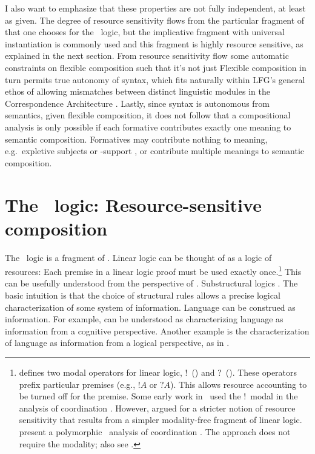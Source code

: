 \documentclass[output=paper,hidelinks]{langscibook}
\begin{document}
I also want to emphasize that
these properties are not fully independent, at least as
given. The degree of resource sensitivity flows from the particular
fragment of  \citep{girard1987} that one chooses for the
\glue\ logic, but the implicative
fragment with universal instantiation is commonly used and this
fragment is highly resource sensitive, as explained in the next
section. From resource sensitivity flow some automatic  constraints on
flexible composition such that it's not just 
Flexible composition in turn permits true autonomy of syntax, which
fits naturally within LFG's general ethos of allowing mismatches
between distinct linguistic modules in the Correspondence Architecture
\citep{kaplan1987three,kaplan1995formal,asudeh2006direct}. Lastly, since syntax is autonomous
from semantics, given flexible composition, it does not follow that a
compositional analysis is only possible if each formative contributes
exactly one meaning to semantic composition. Formatives may contribute
nothing to meaning, e.g.\ expletive subjects or -support
, or contribute multiple meanings to semantic composition. 


\section{The \glue\ logic: Resource-sensitive composition}
\label{sec:glue-logic}
  
The \glue\ logic is a fragment of 
\citep{girard1987,crouch;genabith00}. Linear logic can be thought of as a logic of
resources: Each premise in
a linear logic proof must be used exactly once.\footnote{\citet{girard1987} defines two modal operators for
  linear logic, !\ () and ?\ (). These
  operators prefix particular premises (e.g., $!A$ or $?A$). This
  allows resource accounting to be turned off for the premise. Some
  early work in \glue\ used the !\ modal in the analysis of
  coordination \citep{kehler;ea95,kehler;ea99}. However,
  \citet{Asudeh2004,Asudeh05cont} argued for a stricter notion of
  resource sensitivity that results from a simpler modality-free
  fragment of linear logic. \citet{asudeh;crouch02-lfg-coord}
  present a polymorphic \glue\ analysis of coordination
  \citep{steedman85,emms90,emms92}. The
  \citet{asudeh;crouch02-lfg-coord} approach does not require the
  modality; also see \citet[ch.\,16]{DLM:LFG}.} This can be usefully
understood from the perspective of . Substructural logics 
 \citep[1--2; emphasis in
original]{restall00}. The basic intuition is that the choice of 
structural rules allows a precise logical characterization of some
system of information. Language can be construed as information. For
example, \citet{chomsky86a,chomsky1995the-minimalist} can be understood as characterizing
language as information from a cognitive perspective. Another example
is the characterization of language as information from a logical
perspective, as in \citet{vanbenthem91}. 
\end{document}
